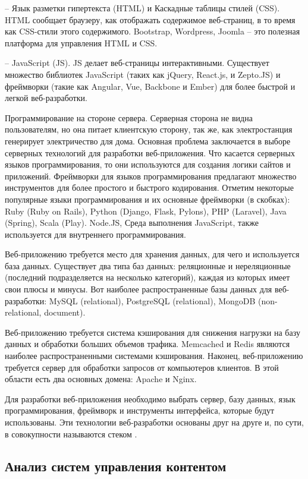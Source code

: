-- Язык разметки гипертекста (HTML) и Каскадные таблицы стилей (CSS).
HTML сообщает браузеру, как отображать содержимое веб-страниц, в то время как CSS-стили этого содержимого.
Bootstrap, Wordpress, Joomla – это полезная платформа для управления HTML и CSS.

-- JavaScript (JS). JS делает веб-страницы интерактивными.
Существует множество библиотек JavaScript (таких как jQuery, React.js, и Zepto.JS) и фреймворки (такие как Angular, Vue, Backbone и Ember) для более быстрой и легкой веб-разработки.

Программирование на стороне сервера.
Серверная сторона не видна пользователям, но она питает клиентскую сторону, так же, как электростанция генерирует электричество для дома.
Основная проблема заключается в выборе серверных технологий для разработки веб-приложения.
Что касается серверных языков программирования, то они используются для создания логики сайтов и приложений.
Фреймворки для языков программирования предлагают множество инструментов для более простого и быстрого кодирования.
Отметим некоторые популярные языки программирования и их основные фреймворки (в скобках): Ruby (Ruby on Rails), Python (Django, Flask, Pylons), PHP (Laravel), Java (Spring), Scala (Play).
Node.JS, Среда выполнения JavaScript, также используется для внутреннего программирования.

Веб-приложению требуется место для хранения данных, для чего и используется база данных.
Существует два типа баз данных: реляционные и нереляционные (последний подразделяется на несколько категорий), каждая из которых имеет свои плюсы и минусы.
Вот наиболее распространенные базы данных для веб-разработки: MySQL (relational), PostgreSQL (relational), MongoDB (non-relational, document).

Веб-приложению требуется система кэширования для снижения нагрузки на базу данных и обработки больших объемов трафика.
Memcached и Redis являются наиболее распространенными системами кэширования.
Наконец, веб-приложению требуется сервер для обработки запросов от компьютеров клиентов.
В этой области есть два основных домена: Apache и Nginx.

Для разработки веб-приложения необходимо выбрать сервер, базу данных, язык программирования, фреймворк и инструменты интерфейса, которые будут использованы.
Эти технологии веб-разработки основаны друг на друге и, по сути, в совокупности называются стеком \cite{ualiev-jebegenov-issledovanie-1}.

\subsection{Анализ систем управления контентом}

